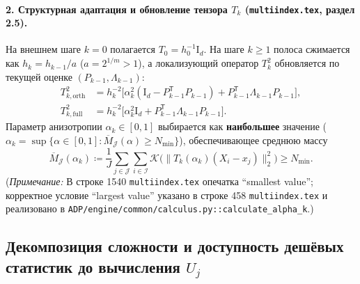 \documentclass[11pt,a4paper]{article}
\newcommand{\Id}{\mathrm{I}}
\newcommand{\T}{^{\mathsf{T}}}
\newcommand{\Kern}{\mathcal{K}}
\newcommand{\TEDR}{T}
\newcommand{\II}{\mathcal{I}}
\newcommand{\JJJ}{\mathcal{J}}
\theoremstyle{definition}
\theoremstyle{remark}
\begin{document}
\paragraph{2. Структурная адаптация и обновление тензора $\TEDR_k$ (\texttt{multiindex.tex}, раздел 2.5).}
На внешнем шаге $k=0$ полагается $\TEDR_0 = h_0^{-1}\Id_d$. На шаге $k \ge 1$ полоса сжимается как $h_k = h_{k-1}/a$ ($a = 2^{1/m} > 1$), а локализующий оператор $\TEDR_k^2$ обновляется по текущей оценке $(P_{k-1}, \Lambda_{k-1})$:
\begin{align}
    \TEDR_{k,\mathrm{orth}}^2 &= h_k^{-2}\bigl[\alpha_k^2 (\Id_d - P_{k-1}\T P_{k-1}) + P_{k-1}\T \Lambda_{k-1} P_{k-1}\bigr], \label{eq:T_orth}\\
    \TEDR_{k,\mathrm{full}}^2 &= h_k^{-2}\bigl[\alpha_k^2 \Id_d + P_{k-1}\T \Lambda_{k-1} P_{k-1}\bigr]. \label{eq:T_full}
\end{align}
Параметр анизотропии $\alpha_k \in [0, 1]$ выбирается как \textbf{наибольшее} значение ($\alpha_k = \sup\{\alpha \in [0,1] : \overline{M}_{\JJJ}(\alpha) \ge N_{\min}\}$), обеспечивающее среднюю массу
\begin{equation}\label{eq:mass_constraint}
    \overline{M}_{\JJJ}(\alpha_k) \coloneqq \frac{1}{J}\sum_{j \in \JJJ}\sum_{i \in \II} \Kern\bigl(\|\TEDR_k(\alpha_k)(X_i - x_j)\|_2^2\bigr) \ge N_{\min}.
\end{equation}
(\emph{Примечание:} В строке 1540 \texttt{multiindex.tex} опечатка ``smallest value''; корректное условие ``largest value'' указано в строке 458 \texttt{multiindex.tex} и реализовано в \texttt{ADP/engine/common/calculus.py::calculate\_alpha\_k}.)

\subsection{Декомпозиция сложности и доступность дешёвых статистик до вычисления $U_j$}
\end{document}

